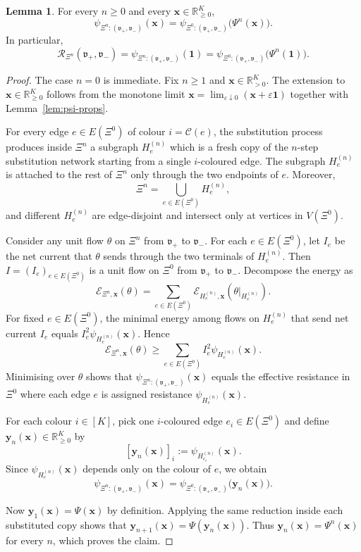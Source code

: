\documentclass{article}
\theoremstyle{plain}
\theoremstyle{definition}
\newtheorem{lemma}[theorem]{Lemma}
\newcommand{\Reff}{\mathscr{R}}
\begin{document}
\begin{lemma}\label{lem:renorm}
For every $n\ge 0$ and every $\mathbf x\in\mathbb R_{\ge 0}^K$,
\[
\psi_{\Xi^{n}:(\mathfrak v_+,\mathfrak v_-)}(\mathbf x)
=
\psi_{\Xi^{0}:(\mathfrak v_+,\mathfrak v_-)}\big(\Psi^{n}(\mathbf x)\big).
\]
In particular,
\[
\Reff_{\Xi^n}(\mathfrak v_+,\mathfrak v_-)
=
\psi_{\Xi^{n}:(\mathfrak v_+,\mathfrak v_-)}(\mathbf 1)
=
\psi_{\Xi^{0}:(\mathfrak v_+,\mathfrak v_-)}\big(\Psi^{n}(\mathbf 1)\big).
\]
\end{lemma}

\begin{proof}
The case $n=0$ is immediate.
Fix $n\ge 1$ and $\mathbf x\in\mathbb R_{>0}^K$.
The extension to $\mathbf x\in\mathbb R_{\ge 0}^K$ follows from the monotone limit
$
\mathbf x=\lim_{\varepsilon\downarrow 0}(\mathbf x+\varepsilon\mathbf 1)
$
together with Lemma~\ref{lem:psi-props}.

For every edge $e\in E(\Xi^0)$ of colour $i=\mathscr C(e)$, the substitution process produces inside $\Xi^n$ a subgraph $H_e^{(n)}$ which is a fresh copy of the $n$-step substitution network starting from a single $i$-coloured edge.
The subgraph $H_e^{(n)}$ is attached to the rest of $\Xi^n$ only through the two endpoints of $e$.
Moreover,
\[
\Xi^n=\bigcup_{e\in E(\Xi^0)} H_e^{(n)},
\]
and different $H_e^{(n)}$ are edge-disjoint and intersect only at vertices in $V(\Xi^0)$.

Consider any unit flow $\theta$ on $\Xi^n$ from $\mathfrak v_+$ to $\mathfrak v_-$.
For each $e\in E(\Xi^0)$, let $I_e$ be the net current that $\theta$ sends through the two terminals of $H_e^{(n)}$.
Then $I=(I_e)_{e\in E(\Xi^0)}$ is a unit flow on $\Xi^0$ from $\mathfrak v_+$ to $\mathfrak v_-$.
Decompose the energy as
\[
\mathcal E_{\Xi^n,\mathbf x}(\theta)
=
\sum_{e\in E(\Xi^0)} \mathcal E_{H_e^{(n)},\mathbf x}(\theta|_{H_e^{(n)}}).
\]
For fixed $e\in E(\Xi^0)$, the minimal energy among flows on $H_e^{(n)}$ that send net current $I_e$ equals
$
I_e^2 \psi_{H_e^{(n)}}(\mathbf x).
$
Hence
\[
\mathcal E_{\Xi^n,\mathbf x}(\theta)
\ge
\sum_{e\in E(\Xi^0)} I_e^2 \psi_{H_e^{(n)}}(\mathbf x).
\]
Minimising over $\theta$ shows that $\psi_{\Xi^n:(\mathfrak v_+,\mathfrak v_-)}(\mathbf x)$ equals the effective resistance in $\Xi^0$ where each edge $e$ is assigned resistance $\psi_{H_e^{(n)}}(\mathbf x)$.

For each colour $i\in[K]$, pick one $i$-coloured edge $e_i\in E(\Xi^0)$ and define $\mathbf y_n(\mathbf x)\in\mathbb R_{\ge 0}^K$ by
\[
[\mathbf y_n(\mathbf x)]_i:=\psi_{H_{e_i}^{(n)}}(\mathbf x).
\]
Since $\psi_{H_e^{(n)}}(\mathbf x)$ depends only on the colour of $e$, we obtain
\[
\psi_{\Xi^n:(\mathfrak v_+,\mathfrak v_-)}(\mathbf x)
=
\psi_{\Xi^0:(\mathfrak v_+,\mathfrak v_-)}\bigl(\mathbf y_n(\mathbf x)\bigr).
\]

Now $\mathbf y_1(\mathbf x)=\Psi(\mathbf x)$ by definition.
Applying the same reduction inside each substituted copy shows that
$
\mathbf y_{n+1}(\mathbf x)=\Psi(\mathbf y_n(\mathbf x)).
$
Thus $\mathbf y_n(\mathbf x)=\Psi^n(\mathbf x)$ for every $n$, which proves the claim.
\end{proof}
\end{document}
